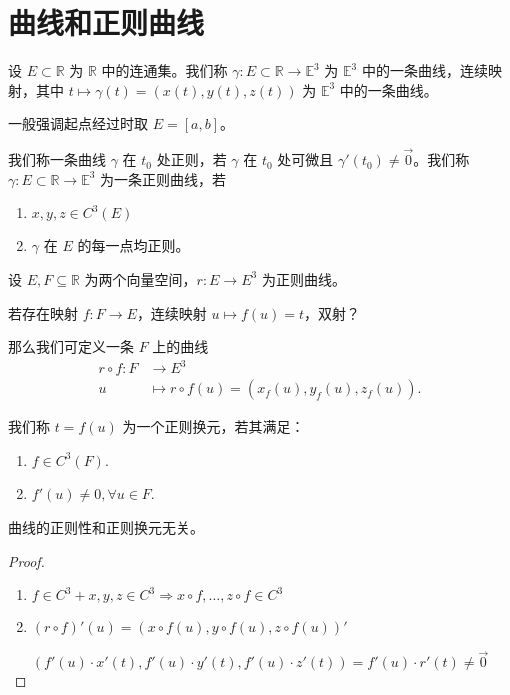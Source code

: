 \documentclass[lang=cn,10pt,thmcnt=section]{elegantbook}
\begin{document}
\section{曲线和正则曲线}
\begin{definition}[曲线]
    设 $E \subset \mathbb{R}$ 为 $\mathbb{R}$ 中的连通集。我们称 $\gamma: E \subset \mathbb{R} \rightarrow \mathbb{E}^3$ 为 $\mathbb{E}^3$ 中的一条曲线，连续映射，其中 $t \mapsto \gamma(t) = (x(t), y(t), z(t))$ 为 $\mathbb{E}^3$ 中的一条曲线。
\end{definition}
\begin{remark}
    一般强调起点经过时取 $E = [a, b]$。
\end{remark}
\begin{definition}[正则曲线]
    我们称一条曲线 $\gamma$ 在 $t_0$ 处正则，若 $\gamma$ 在 $t_0$ 处可微且 $\gamma'(t_0) \neq \vec{0}$。我们称 $\gamma: E \subset \mathbb{R} \rightarrow \mathbb{E}^3$ 为一条正则曲线，若
    \begin{enumerate}
        \item $x, y, z \in C^3(E)$
        \item $\gamma$ 在 $E$ 的每一点均正则。
    \end{enumerate}
\end{definition}
\begin{theorem}
    设 $E, F \subseteq \mathbb{R}$ 为两个向量空间，$r: E \rightarrow E^3$ 为正则曲线。
    
    若存在映射 $f: F \rightarrow E$，连续映射 $u \mapsto f(u) = t$，双射？
    
    那么我们可定义一条 $F$ 上的曲线
\begin{align*}
r \circ f: F &\longrightarrow E^3 \\
u &\longmapsto r \circ f(u) = (x_f(u), y_f(u), z_f(u)).
\end{align*}
\end{theorem}
我们称 $t = f(u)$ 为一个正则换元，若其满足：
\begin{enumerate}
    \item $f \in C^3(F)$.
    \item $f'(u) \neq 0, \forall u \in F$.
\end{enumerate}

\begin{theorem}\label{thm:regular_parameter}
曲线的正则性和正则换元无关。
\end{theorem}
\begin{proof}
    \begin{enumerate}
        \item $f \in C^3 + x, y, z \in C^3 \Rightarrow x \circ f, \ldots, z \circ f \in C^3$
        \item $ (r \circ f)'(u) = (x \circ f(u), y \circ f(u), z \circ f(u))' $
    \end{enumerate}
    
    \[
    (f'(u) \cdot x'(t), f'(u) \cdot y'(t), f'(u) \cdot z'(t)) = f'(u) \cdot r'(t) \neq \vec{0}
    \]
\end{proof}
\end{document}
